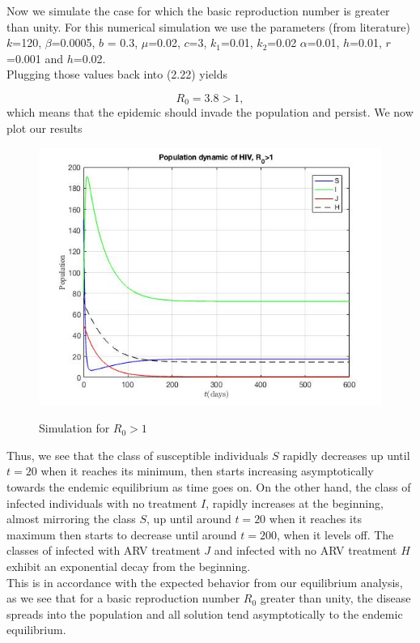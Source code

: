 Now we simulate the case for which the basic reproduction number is greater than unity. For this numerical simulation we use the parameters (from literature)\\

$k$=120, $\beta$=0.0005, $b$ = 0.3, $\mu$=0.02, $c$=3, $k_{1}$=0.01, $k_{2}$=0.02 $\alpha$=0.01, $h$=0.01, $r$=0.001 and $h$=0.02.\\

Plugging those values back into (2.22) yields

$$
R_{0} = 3.8 > 1,
$$
which means that the epidemic should invade the population and persist. We now plot our results

\begin{figure}[H]
	{\includegraphics[scale=0.7]{hiv_art2.jpg}}
	\caption{Simulation for $R_{0} > 1$}
\end{figure}

Thus, we see that the class of susceptible individuals $S$ rapidly decreases up until $t=20$ when it reaches its minimum, then starts increasing asymptotically towards the endemic equilibrium as time goes on. On the other hand, the class of infected individuals with no treatment $I$, rapidly increases at the beginning, almost mirroring the class $S$, up until around $t=20$ when it reaches its maximum then starts to decrease until around $t=200$, when it levels off. The classes of infected with ARV treatment $J$ and infected with no ARV treatment $H$ exhibit an exponential decay from the beginning.\\
This is in accordance with the expected behavior from our equilibrium analysis, as we see that for a basic reproduction number $R_{0}$ greater than unity, the disease spreads into the population and all solution tend asymptotically to the endemic equilibrium.

